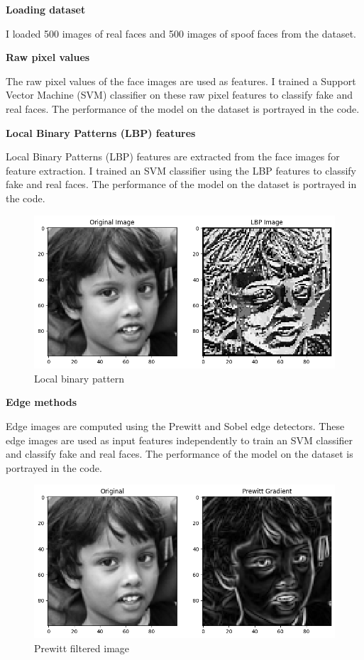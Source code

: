 \textbf{Loading dataset}

I loaded 500 images of real faces and 500 images of spoof faces from the dataset.

\textbf{Raw pixel values}

The raw pixel values of the face images are used as features. I trained a Support Vector Machine (SVM) classifier on these raw pixel features to classify fake and real faces. The performance of the model on the dataset is portrayed in the code.

\textbf{Local Binary Patterns (LBP) features}

Local Binary Patterns (LBP) features are extracted from the face images for feature extraction. I trained an SVM classifier using the LBP features to classify fake and real faces. The performance of the model on the dataset is portrayed in the code.

\begin{figure}[H]
    \centering
    \includegraphics[width=.9\textwidth]{imgs/lbp.png}
    \caption{Local binary pattern}
    \label{fig:2_mediapipe}
\end{figure}

\newpage

\textbf{Edge methods}

Edge images are computed using the Prewitt and Sobel edge detectors. These edge images are used as input features independently to train an SVM classifier and classify fake and real faces. The performance of the model on the dataset is portrayed in the code.

\begin{figure}[H]
    \centering
    \includegraphics[width=.9\textwidth]{imgs/prewitt.png}
    \caption{Prewitt filtered image}
    \label{fig:2_mediapipe}
\end{figure}


